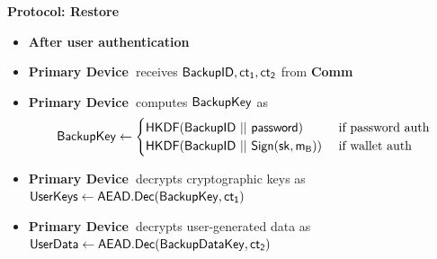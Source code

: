 \documentclass{article}
\newcommand{\sk}{{\sf sk}}
\newcommand{\pw}{{\sf password}}
\newcommand{\bk}{{\sf BackupKey}}
\newcommand{\bkdata}{{\sf BackupDataKey}}
\newcommand{\bid}{\sf BackupID}
\newcommand{\hkdf}{\sf HKDF}
\newcommand{\sign}{\sf Sign}
\newcommand{\aesdec}{\sf AEAD.Dec}
\newcommand{\ct}{\sf ct}
\newcommand{\userdata}{{\sf UserData}}
\newcommand{\userkeys}{{\sf UserKeys}}
\newcommand{\pdevice}{{\bf \color{red} Primary Device~}}
\newcommand{\comm}{{\bf \color{blue} Comm~}}
\newcommand{\afterauth}{{\bf \color{teal} After user authentication~}}
\begin{document}

\noindent \textbf{Protocol: Restore}
\begin{itemize}
    \item \afterauth
    \item \pdevice receives $\bid, \ct_1, \ct_2$ from \comm
    \item \pdevice computes $\bk$ as
        \[ \bk \gets \begin{cases} 
      \hkdf(\bid~||~\pw) & \text{ if password auth} \\
      \hkdf(\bid~||~\sign(\sk, m_B)) & \text{ if wallet auth} \end{cases} \]
    \item \pdevice decrypts cryptographic keys as $\userkeys \gets \aesdec(\bk, \ct_1)$
    \item \pdevice decrypts user-generated data as $\userdata \gets \aesdec(\bkdata, \ct_2)$
\end{itemize}
\end{document}
